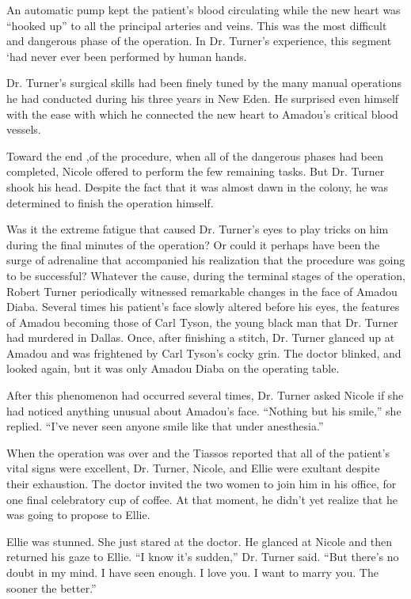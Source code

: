 \documentclass[]{article}
\begin{document}
{An automatic pump kept the patient’s blood circulating while the new heart was “hooked up” to all the principal arteries and veins.  This was the most difficult and dangerous phase of the operation.  In Dr.  Turner’s experience, this segment ‘had never ever been performed by human hands.

Dr.  Turner’s surgical skills had been finely tuned by the many manual operations he had conducted during his three years in New Eden.  He surprised even himself with the ease with which he connected the new heart to Amadou’s critical blood vessels.

Toward the end ,of the procedure, when all of the dangerous phases had been completed, Nicole offered to perform the few remaining tasks.  But Dr.  Turner shook his head.  Despite the fact that it was almost dawn in the colony, he was determined to finish the operation himself.

Was it the extreme fatigue that caused Dr.  Turner’s eyes to play tricks on him during the final minutes of the operation? Or could it perhaps have been the surge of adrenaline that accompanied his realization that the procedure was going to be successful? Whatever the cause, during the terminal stages of the operation, Robert Turner periodically witnessed remarkable changes in the face of Amadou Diaba.  Several times his patient’s face slowly altered before his eyes, the features of Amadou becoming those of Carl Tyson, the young black man that Dr.  Turner had murdered in Dallas.  Once, after finishing a stitch, Dr.  Turner glanced up at Amadou and was frightened by Carl Tyson’s cocky grin.  The doctor blinked, and looked again, but it was only Amadou Diaba on the operating table.

After this phenomenon had occurred several times, Dr.  Turner asked Nicole if she had noticed anything unusual about Amadou’s face.  “Nothing but his smile,” she replied.  “I’ve never seen anyone smile like that under anesthesia.”

When the operation was over and the Tiassos reported that all of the patient’s vital signs were excellent, Dr.  Turner, Nicole, and Ellie were exultant despite their exhaustion.  The doctor invited the two women to join him in his office, for one final celebratory cup of coffee.  At that moment, he didn’t yet realize that he was going to propose to Ellie.

Ellie was stunned.  She just stared at the doctor.  He glanced at Nicole and then returned his gaze to Ellie.  “I know it’s sudden,” Dr.  Turner said.  “But there’s no doubt in my mind.  I have seen enough.  I love you.  I want to marry you.  The sooner the better.”

}
\end{document}

